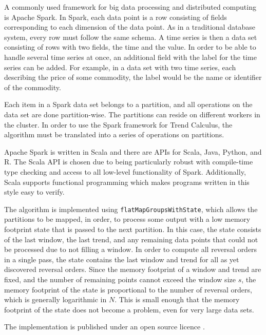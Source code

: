 \documentclass[../trend-calculus.tex]{subfiles}
\begin{document}
  A commonly used framework for big data processing and
  distributed computing is Apache Spark.
  In Spark, each data point is a row consisting of fields
  corresponding to each dimension of the data point.
  As in a traditional database system, every row must follow the same schema.
  A time series is then a data set consisting of rows with two fields, the time and the value.
  In order to be able to handle several time series at once, 
  an additional field with the label for the time series can be added.
  For example, in a data set with two time series, each describing the price of some commodity, 
  the label would be the name or identifier of the commodity.

  Each item in a Spark data set belongs to a partition, and 
  all operations on the data set are done partition-wise.
  The partitions can reside on different workers in the cluster.
  In order to use the Spark framework for Trend Calculus, 
  the algorithm must be translated into a series of operations on partitions.

  Apache Spark is written in Scala and there are APIs for Scala, Java, Python, and R.
  The Scala API is chosen due to being particularly robust with 
  compile-time type checking and access to all low-level functionality of Spark.
  Additionally, Scala supports functional programming which 
  makes programs written in this style easy to verify.
  
  The algorithm is implemented using \verb|flatMapGroupsWithState|, 
  which allows the partitions to be mapped, in order, 
  to process some output with a low memory footprint state that is passed to the next partition.
  In this case, the state consists of the last window, the last trend, and 
  any remaining data points that could not be processed due to not filling a window.
  In order to compute all reversal orders in a single pass, 
  the state contains the last window and trend for all as yet discovered reversal orders.
  Since the memory footprint of a window and trend are fixed, 
  and the number of remaining points cannot exceed the window size $s$, 
  the memory footprint of the state is proportional to the number of reversal orders, 
  which is generally logarithmic in $N$.
  This is small enough that the memory footprint of the state does not become a problem, 
  even for very large data sets.
  
  The implementation is published under an open source licence \cite{spark-trendcalculus}.
 
\end{document}
